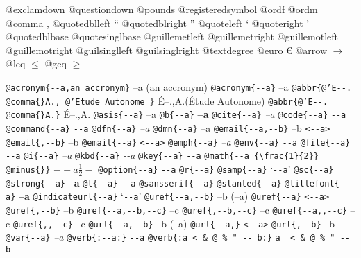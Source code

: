 \documentclass{book}
\begin{document}
\begin{titlepage}
@exclamdown \textexclamdown{}
@questiondown \textquestiondown{}
@pounds \textsterling{}
@registeredsymbol \circledR{}
@ordf \textordfeminine{}
@ordm \textordmasculine{}
@comma ,
@quotedblleft \textquotedblleft{}
@quotedblright \textquotedblright{}
@quoteleft \textquoteleft{}
@quoteright \textquoteright{}
@quotedblbase \quotedblbase{}
@quotesinglbase \quotesinglbase{}
@guillemetleft \guillemotleft{}
@guillemetright \guillemotright{}
@guillemotleft \guillemotleft{}
@guillemotright \guillemotright{}
@guilsinglleft \guilsinglleft{}
@guilsinglright \guilsinglright{}
@textdegree \textdegree{}
@euro \euro{}
@arrow $\rightarrow{}$
@leq $\leq{}$
@geq $\geq{}$

\texttt{@acronym\{{-}{-}a,an accronym\}} --a (an accronym)
\texttt{@acronym\{{-}{-}a\}} --a
\texttt{@abbr\{@'E{-}{-}. @comma\{\}A., @'Etude Autonome \}} \'{E}--.\@ ,A.\@ (\'{E}tude Autonome)
\texttt{@abbr\{@'E{-}{-}. @comma\{\}A.\}} \'{E}--.\@ ,A.\@
\texttt{@asis\{{-}{-}a\}} --a
\texttt{@b\{{-}{-}a\}} \textbf{--a}
\texttt{@cite\{{-}{-}a\}} \textit{--a}
\texttt{@code\{{-}{-}a\}} \texttt{{-}{-}a}
\texttt{@command\{{-}{-}a\}} \texttt{{-}{-}a}
\texttt{@dfn\{{-}{-}a\}} \emph{--a}
\texttt{@dmn\{{-}{-}a\}} --a
\texttt{@email\{{-}{-}a,{-}{-}b\}} --b \texttt{<{-}{-}a>}
\texttt{@email\{,{-}{-}b\}} --b
\texttt{@email\{{-}{-}a\}} \texttt{<{-}{-}a>}
\texttt{@emph\{{-}{-}a\}} \emph{--a}
\texttt{@env\{{-}{-}a\}} \texttt{{-}{-}a}
\texttt{@file\{{-}{-}a\}} \texttt{{-}{-}a}
\texttt{@i\{{-}{-}a\}} \textit{--a}
\texttt{@kbd\{{-}{-}a\}} {\ttfamily\textsl{{-}{-}a}}
\texttt{@key\{{-}{-}a\}} \texttt{{-}{-}a}
\texttt{@math\{{-}{-}a \{\textbackslash{}frac\{1\}\{2\}\} @minus\{\}\}} $--a {\frac{1}{2}} -$
\texttt{@option\{{-}{-}a\}} \texttt{{-}{-}a}
\texttt{@r\{{-}{-}a\}} 
\texttt{@samp\{{-}{-}a\}} `\texttt{{-}{-}a}'
\texttt{@sc\{{-}{-}a\}} 
\texttt{@strong\{{-}{-}a\}} \textbf{--a}
\texttt{@t\{{-}{-}a\}} \texttt{{-}{-}a}
\texttt{@sansserif\{{-}{-}a\}} 
\texttt{@slanted\{{-}{-}a\}} 
\texttt{@titlefont\{{-}{-}a\}} {\Huge \bfseries --a}
\texttt{@indicateurl\{{-}{-}a\}} `\texttt{{-}{-}a}'
\texttt{@uref\{{-}{-}a,{-}{-}b\}} --b (--a)
\texttt{@uref\{{-}{-}a\}} \texttt{<{-}{-}a>}
\texttt{@uref\{,{-}{-}b\}} --b
\texttt{@uref\{{-}{-}a,{-}{-}b,{-}{-}c\}} --c
\texttt{@uref\{,{-}{-}b,{-}{-}c\}} --c
\texttt{@uref\{{-}{-}a,,{-}{-}c\}} --c
\texttt{@uref\{,,{-}{-}c\}} --c
\texttt{@url\{{-}{-}a,{-}{-}b\}} --b (--a)
\texttt{@url\{{-}{-}a,\}} \texttt{<{-}{-}a>}
\texttt{@url\{,{-}{-}b\}} --b
\texttt{@var\{{-}{-}a\}} \emph{--a}
\texttt{@verb\{:{-}{-}a:\}} \verb:--a:
\texttt{@verb\{:a  < \& @ \% " {-}{-}    b:\}} \verb:a  < & @ % " --    b:

\end{titlepage}
\end{document}
